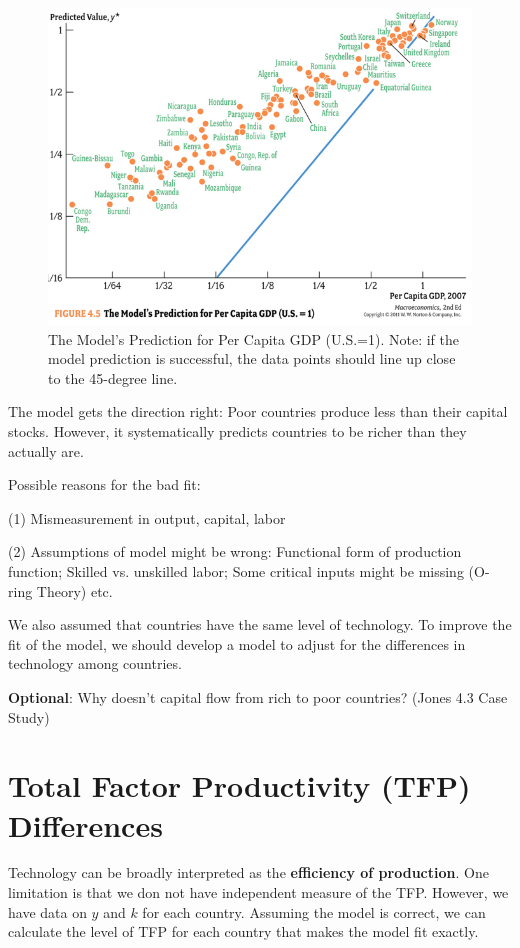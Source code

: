 \documentclass[12pt]{article}
\begin{document}
\begin{figure}[H]
\caption{The Model's Prediction for Per Capita GDP (U.S.=1). Note: if the model prediction is successful, the data points should line up close to the 45-degree line.}
\centering
\includegraphics[width=120mm, scale=0.5]{Figure_4-5.png}
\end{figure}


The model gets the direction right: Poor countries produce less than their capital stocks. However, it systematically predicts countries to be richer than they actually are.

Possible reasons for the bad fit: 

(1) Mismeasurement in output, capital, labor

(2) Assumptions of model might be wrong: Functional form of production function; Skilled vs. unskilled labor; Some critical inputs might be missing (O-ring Theory) etc. 

We also assumed that countries have the same level of technology. To improve the fit of the model, we should develop a model to adjust for the differences in technology among countries.

\textbf{Optional}: Why doesn't capital flow from rich to poor countries? (Jones 4.3 Case Study)

\section{Total Factor Productivity (TFP) Differences}

Technology can be broadly interpreted as the \textbf{efficiency of production}. One limitation is that we don not have independent measure of the TFP. However, we have data on $y$ and $k$ for each country. Assuming the model is correct, we can calculate the level of TFP for each country that makes the model fit exactly.
\end{document}
